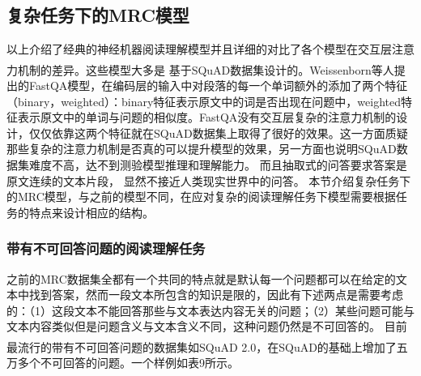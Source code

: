 \documentclass{article}
\makeatletter
\newenvironment{figurehere}
 {\def\@captype{figure}}
 {}
\newcommand{\upcite}[1]{\textsuperscript{\textsuperscript{\cite{#1}}}}
\makeatother
\begin{document}
\subsection{复杂任务下的MRC模型}
以上介绍了经典的神经机器阅读理解模型并且详细的对比了各个模型在交互层注意力机制的差异。这些模型大多是
基于SQuAD\upcite{SQuAD1}数据集设计的。Weissenborn等人\upcite{fastqa}提出的FastQA模型，在编码层的输入中对段落的每一个单词额外的添加了两个特征（binary，weighted）：binary特征表示原文中的词是否出现在问题中，weighted特征表示原文中的单词与问题的相似度。FastQA没有交互层复杂的注意力机制的设计，仅仅依靠这两个特征就在SQuAD数据集上取得了很好的效果。这一方面质疑那些复杂的注意力机制是否真的可以提升模型的效果，另一方面也说明SQuAD数据集难度不高，达不到测验模型推理和理解能力。
而且抽取式的问答要求答案是原文连续的文本片段，
显然不接近人类现实世界中的问答。
本节介绍复杂任务下的MRC模型，与之前的模型不同，在应对复杂的阅读理解任务下模型需要根据任务的特点来设计相应的结构。


\subsubsection{带有不可回答问题的阅读理解任务}\label{unknown}
之前的MRC数据集全都有一个共同的特点就是默认每一个问题都可以在给定的文本中找到答案，然而一段文本所包含的知识是限的，因此有下述两点是需要考虑的：（1）这段文本不能回答那些与文本表达内容无关的问题；（2）某些问题可能与文本内容类似但是问题含义与文本含义不同，这种问题仍然是不可回答的。
目前最流行的带有不可回答问题的数据集如SQuAD 2.0\upcite{SQuAD2}，在SQuAD的基础上增加了五万多个不可回答的问题。一个样例如表9所示。
\end{document}
